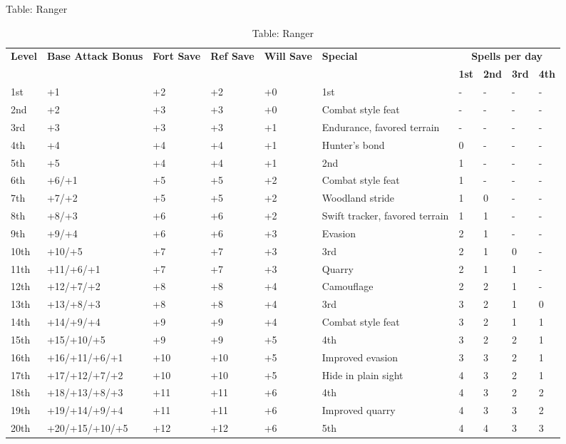 Table: Ranger
\begin{table*}[]
\sffamily
\caption{Table: Ranger}
\begin{tabularx}{\linewidth}{lllllXllll}
\multirow{2}{*}{\textbf{Level}} & \multirow{2}{*}{\parbox{5em}{\textbf{Base Attack Bonus}}} & \multirow{2}{*}{\parbox{1.5em}{\textbf{Fort Save}}} & \multirow{2}{*}{\parbox{1.5em}{\textbf{Ref Save}}} & \multirow{2}{*}{\parbox{1.5em}{\textbf{Will Save}}} & \multirow{2}{*}{\textbf{Special}}  & \multicolumn{4}{c}{\textbf{Spells per day}} \\
                       &                                    &                            &                           &                            &                                                                        & \textbf{1st}  & \textbf{2nd} & \textbf{3rd} & \textbf{4th} \\
1st & +1 & +2 & +2 & +0 & 1st  & - & - & - & -\\
2nd & +2 & +3 & +3 & +0 & Combat style feat & - & - & - & -\\
3rd & +3 & +3 & +3 & +1 & Endurance, favored terrain & - & - & - & -\\
4th & +4 & +4 & +4 & +1 & Hunter's bond & 0 & - & - & -\\
5th & +5 & +4 & +4 & +1 & 2nd  & 1 & - & - & -\\
6th & +6/+1 & +5 & +5 & +2 & Combat style feat & 1 & - & - & -\\
7th & +7/+2 & +5 & +5 & +2 & Woodland stride & 1 & 0 & - & -\\
8th & +8/+3 & +6 & +6 & +2 & Swift tracker, favored terrain & 1 & 1 & - & -\\
9th & +9/+4 & +6 & +6 & +3 & Evasion & 2 & 1 & - & -\\
10th & +10/+5 & +7 & +7 & +3 & 3rd  & 2 & 1 & 0 & -\\
11th & +11/+6/+1 & +7 & +7 & +3 & Quarry & 2 & 1 & 1 & -\\
12th & +12/+7/+2 & +8 & +8 & +4 & Camouflage & 2 & 2 & 1 & -\\
13th & +13/+8/+3 & +8 & +8 & +4 & 3rd  & 3 & 2 & 1 & 0\\
14th & +14/+9/+4 & +9 & +9 & +4 & Combat style feat & 3 & 2 & 1 & 1\\
15th & +15/+10/+5 & +9 & +9 & +5 & 4th  & 3 & 2 & 2 & 1\\
16th & +16/+11/+6/+1 & +10 & +10 & +5 & Improved evasion & 3 & 3 & 2 & 1\\
17th & +17/+12/+7/+2 & +10 & +10 & +5 & Hide in plain sight & 4 & 3 & 2 & 1\\
18th & +18/+13/+8/+3 & +11 & +11 & +6 & 4th  & 4 & 3 & 2 & 2\\
19th & +19/+14/+9/+4 & +11 & +11 & +6 & Improved quarry & 4 & 3 & 3 & 2\\
20th & +20/+15/+10/+5 & +12 & +12 & +6 & 5th  & 4 & 4 & 3 & 3\\
\end{tabularx}
\end{table*}

